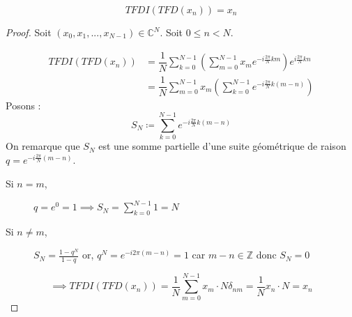 \label{demo2}
$$TFDI(TFD(x_n)) = x_n$$
\begin{proof}
    Soit $(x_0,x_1,...,x_{N-1}) \in \mathbb{C}^N$. Soit $0 \leq n < N$.

    \begin{align*}
        TFDI(TFD(x_n))&=\dfrac{1}{N} \sum_{k=0}^{N-1} \left(\sum_{m=0}^{N-1} x_m e^{-i \frac{2\pi}{N} km}\right) e^{i \frac{2 \pi}{N}kn} \\
        &= \dfrac{1}{N} \sum_{m=0}^{N-1} x_m \left( \sum_{k=0}^{N-1} e^{-i \frac{2\pi}{N} k(m-n)} \right)
    \end{align*}
    Posons :
    $$S_N \coloneq \sum_{k=0}^{N-1}e^{-i \frac{2\pi}{N} k(m-n)}$$
    On remarque que $S_N$ est une somme partielle d'une suite géométrique de raison $q = e^{-i \frac{2\pi}{N} (m-n)}$.
    \begin{description}
        \item[Si $n=m$, ] $q = e^0 = 1 \implies S_N = \sum_{k=0}^{N-1} 1 = N$  
        \item[Si $n\neq m$, ] $S_N=\frac{1-q^N}{1-q}$ or, $q^N = e^{-i2\pi(m-n)} = 1$ car $m-n\in \mathbb{Z}$ donc $S_N = 0$ 
    \end{description}
    $$\implies TFDI(TFD(x_n)) =\dfrac{1}{N}\sum_{m=0}^{N-1}x_m \cdot N \delta_{nm} = \dfrac{1}{N}x_n\cdot N = x_n$$
\end{proof}

\pagebreak

